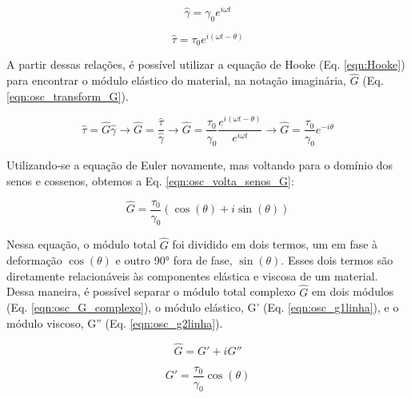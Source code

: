 			\begin{equation}
				\hat{\gamma} = \gamma_0 e^{i\omega t}
				\label{eqn:osc_gamma_im}
			\end{equation}
			
			\begin{equation}
				\hat{\tau} = \tau_0 e^{i(\omega t - \theta)}
				\label{eqn:osc_tau_im}
			\end{equation}
			
			A partir dessas relações, é possível utilizar a equação de Hooke (Eq. \ref{eqn:Hooke}) para encontrar o módulo elástico do material, na notação imaginária, \(\hat{G}\) (Eq. \ref{eqn:osc_transform_G}).
			
			\begin{equation}
				\hat{\tau} = \hat{G}\hat{\gamma} \to \hat{G} = \dfrac{\hat{\tau}}{\hat{\gamma}}    \to 
				\hat{G} = \dfrac{\tau_0}{\gamma_0} \dfrac{e^{i(\omega t - \theta)}}{e^{i\omega t}} \to
				\hat{G} = \dfrac{\tau_0}{\gamma_0} e^{-i\theta}
				\label{eqn:osc_transform_G}
			\end{equation}
			
			Utilizando-se a equação de Euler novamente, mas voltando para o domínio dos senos e cossenos, obtemos a Eq. \ref{eqn:osc_volta_senos_G}:
			
			\begin{equation}
				\hat{G} = \dfrac{\tau_0}{\gamma_0} \left( \cos(\theta) + i\sin(\theta) \right)
				\label{eqn:osc_volta_senos_G}
			\end{equation}
			
			Nessa equação, o módulo total \(\hat{G}\) foi dividido em dois termos, um em fase à deformação \(\cos(\theta)\) e outro 90° fora de fase, \(\sin(\theta)\). Esses dois termos são diretamente relacionáveis às componentes elástica e viscosa de um material. Dessa maneira, é possível separar o módulo total complexo \(\hat{G}\) em dois módulos (Eq. \ref{eqn:osc_G_complexo}), o módulo elástico, G' (Eq. \ref{eqn:osc_g1linha}), e o módulo viscoso, G'' (Eq. \ref{eqn:osc_g2linha}).
			
			\begin{equation}
				\hat{G} = G' + iG''
				\label{eqn:osc_G_complexo}
			\end{equation}
			
			\begin{equation} 
				G' = \dfrac{\tau_0}{\gamma_0} \cos(\theta)
				\label{eqn:osc_g1linha}
			\end{equation} 
			
